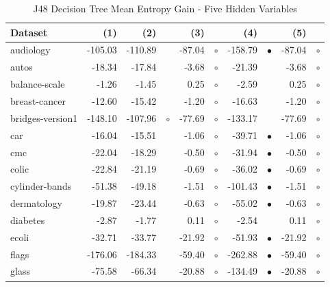 \newpage
{\centering \footnotesize \begin{longtable}{lrr@{\hspace{0.1cm}}cr@{\hspace{0.1cm}}cr@{\hspace{0.1cm}}cr@{\hspace{0.1cm}}c}
\caption{\label{j48meg5}J48 Decision Tree Mean Entropy Gain - Five Hidden Variables}
\\
\hline
Dataset & (1)& (2) & & (3) & & (4) & & (5) & \\
\hline
audiology & -105.03 & -110.89 &           &  -87.04 &  $\circ$ & -158.79 & $\bullet$ &  -87.04 &  $\circ$\\
autos &  -18.34 &  -17.84 &           &   -3.68 &  $\circ$ &  -21.39 &           &   -3.68 &  $\circ$\\
balance-scale &   -1.26 &   -1.45 &           &    0.25 &  $\circ$ &   -2.59 &           &    0.25 &  $\circ$\\
breast-cancer &  -12.60 &  -15.42 &           &   -1.20 &  $\circ$ &  -16.63 &           &   -1.20 &  $\circ$\\
bridges-version1 & -148.10 & -107.96 &   $\circ$ &  -77.69 &  $\circ$ & -133.17 &           &  -77.69 &  $\circ$\\
car &  -16.04 &  -15.51 &           &   -1.06 &  $\circ$ &  -39.71 & $\bullet$ &   -1.06 &  $\circ$\\
cmc &  -22.04 &  -18.29 &           &   -0.50 &  $\circ$ &  -31.94 & $\bullet$ &   -0.50 &  $\circ$\\
colic &  -22.84 &  -21.19 &           &   -0.69 &  $\circ$ &  -36.02 & $\bullet$ &   -0.69 &  $\circ$\\
cylinder-bands &  -51.38 &  -49.18 &           &   -1.51 &  $\circ$ & -101.43 & $\bullet$ &   -1.51 &  $\circ$\\
dermatology &  -19.87 &  -23.44 &           &   -0.63 &  $\circ$ &  -55.02 & $\bullet$ &   -0.63 &  $\circ$\\
diabetes &   -2.87 &   -1.77 &           &    0.11 &  $\circ$ &   -2.54 &           &    0.11 &  $\circ$\\
ecoli &  -32.71 &  -33.77 &           &  -21.92 &  $\circ$ &  -51.93 & $\bullet$ &  -21.92 &  $\circ$\\
flags & -176.06 & -184.33 &           &  -59.40 &  $\circ$ & -262.88 & $\bullet$ &  -59.40 &  $\circ$\\
glass &  -75.58 &  -66.34 &           &  -20.88 &  $\circ$ & -134.49 & $\bullet$ &  -20.88 &  $\circ$\\

\end{longtable}}
